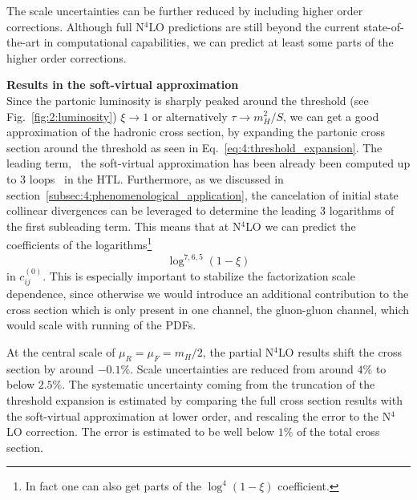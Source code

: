 The scale uncertainties can be further reduced by including higher order corrections. Although full N${}^4$LO predictions are still beyond the current state-of-the-art in computational capabilities, we can predict at least some parts of the higher order corrections.

\textbf{Results in the soft-virtual approximation}\\
Since the partonic luminosity is sharply peaked around the threshold (see Fig.~\ref{fig:2:luminosity}) $\xi \rightarrow 1$ or alternatively $\tau \rightarrow m_H^2/S$, we can get a good approximation of the hadronic cross section, by expanding the partonic cross section around the threshold as seen in Eq.~\eqref{eq:4:threshold_expansion}. The leading term, \ie\ the soft-virtual approximation has been already been computed up to 3 loops~\cite{Das:2020adl} in the \acs{HTL}. Furthermore, as we discussed in section~\ref{subsec:4:phenomenological_application}, the cancelation of initial state collinear divergences can be leveraged to determine the leading 3 logarithms of the first subleading term. This means that at N${}^4$LO we can predict the coefficients of the logarithms\footnote{In fact one can also get parts of the $\log^4 (1 - \xi)$ coefficient.}
\begin{equation}
\log^{7,6,5} (1 - \xi)
\end{equation}
in $c_{ij}^{(0)}$. This is especially important to stabilize the factorization scale dependence, since otherwise we would introduce an additional contribution to the cross section which is only present in one channel, the gluon-gluon channel, which would scale with running of the \acs{PDF}s.

At the central scale of $\mu_R = \mu_F = m_H/2$, the partial N${}^4$LO results shift the cross section by around $-0.1\%$. Scale uncertainties are reduced from around $4\%$ to below $2.5\%$. The systematic uncertainty coming from the truncation of the threshold expansion is estimated by comparing the full cross section results with the soft-virtual approximation at lower order, and rescaling the error to the N${}^4$LO correction. The error is estimated to be well below $1\%$ of the total cross section. 

